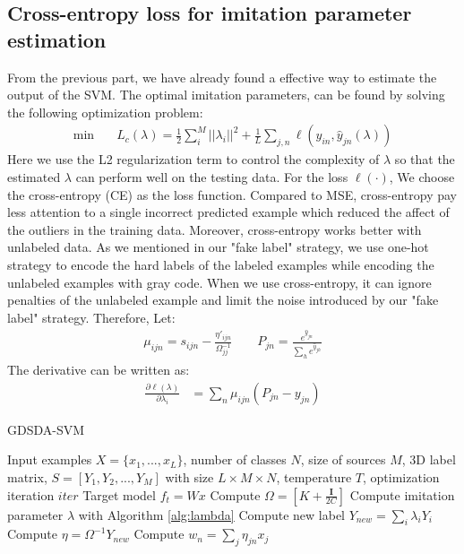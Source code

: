 \subsection{Cross-entropy loss for imitation parameter estimation}
From the previous part, we have already found a effective way to estimate the output of the SVM. The optimal imitation parameters, can be found by solving the following optimization problem:
\begin{equation}\label{eq:loo_loss}
\begin{aligned}
\min \quad& L_c\left(\lambda\right)=\frac{1}{2}\sum_i^M||\lambda_i||^2+\frac{1}{L}\sum_{j,n}\ell\left(y_{in},\hat{y}_{jn}\left(\lambda\right)\right)
\end{aligned}
\end{equation}
Here we use the L2 regularization term to control the complexity of $\lambda$ so that the estimated $\lambda$ can perform well on the testing data. For the loss $\ell(\cdot)$, We choose the cross-entropy (CE) as the loss function.
Compared to MSE, cross-entropy pay less attention to a single incorrect predicted example which reduced the affect of the outliers in the training data. Moreover, cross-entropy works better with unlabeled data. As we mentioned in our "fake label" strategy, we use one-hot strategy to encode the hard labels of the labeled examples while encoding the unlabeled examples with gray code. When we use cross-entropy, it can ignore penalties of the unlabeled example and limit the noise introduced by our "fake label" strategy. Therefore, 
Let:
\begin{equation}\label{eq:mu}
\begin{aligned}
\mu_{ijn}=s_{ijn}-\frac{{\eta}'_{ijn}}{\Omega_{jj}^{-1}} \qquad
P_{jn} = \frac{e^{\hat{y}_{jn}}}{\sum_{h} e^{\hat{y}_{jh}}}
\end{aligned}
\end{equation}
The derivative can be written as:
\begin{equation}\label{eq:p}
\begin{aligned}
\frac{\partial \ell(\lambda)}{\partial \lambda_i}&=\sum_n\mu_{ijn}\left(P_{jn}-{y}_{jn}\right)
\end{aligned}
\end{equation}
\begin{algorithm}[t]
	\caption{GDSDA-SVM}\label{alg:svm}
	\begin{algorithmic}
		\Require Input examples $X=\{x_1,...,x_L\}$, number of classes $N$, size of sources $M$, 3D label matrix, $S=[Y_1,Y_2,...,Y_{M}]$ with size $L\times M \times N$, temperature $T$, optimization iteration $iter$
		\Ensure Target model $f_t = Wx$
		\State Compute $\Omega=[K+\frac{\mathbf{I}}{2C}]$
		\State Compute imitation parameter $\lambda$ with Algorithm \ref{alg:lambda}
		\State Compute new label $Y_{new}=\sum_i\lambda_iY_i$
		\State Compute $\eta = \Omega^{-1}Y_{new}$
		\State Compute $w_n = \sum_j \eta_{jn}x_j$
	\end{algorithmic}	
\end{algorithm}
